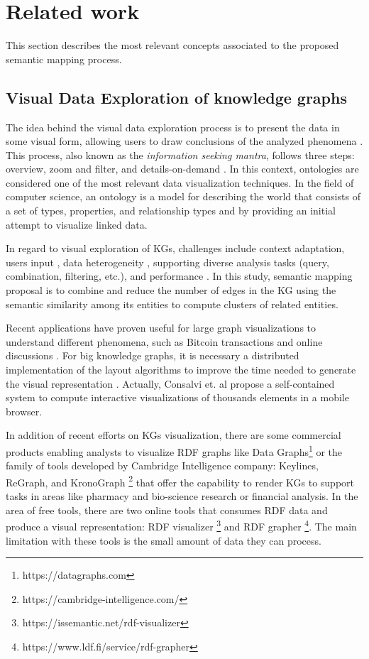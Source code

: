 \documentclass{ieeeaccess}
\begin{document}
\section{Related work}
\label{sec:related}

This section describes the most relevant concepts associated to
the proposed semantic mapping process.

\subsection{Visual Data Exploration of knowledge graphs}
The idea behind the visual data exploration process is to present 
the data in some visual form, allowing users to draw conclusions 
of the analyzed phenomena \cite{keim2001visual}. This process, also
known as the \textit{information seeking mantra}, follows three steps: overview,
zoom and filter, and details-on-demand \cite{Shneiderman96}. In this
context, ontologies are considered one of the most relevant data
visualization techniques. In the field of computer science, an ontology
is a model for describing the world that consists of a set of types,
properties, and relationship types \cite{Garshol2004MetadataTT}
and by providing an initial attempt to visualize linked data.

In regard to visual exploration of KGs, challenges include context
adaptation, users input \cite{Koutra2019}, data heterogeneity
\cite{OntoVis,6787141,1703364}, supporting diverse analysis tasks 
(query, combination, filtering, etc.), and performance
\cite{gomez2018visualizing}. In this study, semantic mapping proposal
is to combine and reduce the number of edges in the KG using the 
semantic similarity among its entities to compute clusters of related
entities.


Recent applications have proven useful for large graph visualizations 
to understand different phenomena, such as Bitcoin transactions 
\cite{mcginn2016visualizing} and online discussions
\cite{molina2017improving}. For big knowledge graphs, it is necessary a
distributed implementation of the layout algorithms to improve the time 
needed to generate the visual representation
\cite{gomez2018visualizing}. Actually, Consalvi et. al \cite{Consalvi2022} 
propose a self-contained system to compute interactive visualizations of
thousands elements in a mobile browser.

In addition of recent efforts on KGs visualization, there are some commercial
products enabling analysts to visualize RDF graphs like Data
Graphs\footnote{https://datagraphs.com} or the 
family of tools developed by Cambridge Intelligence company: Keylines, 
ReGraph, and KronoGraph \footnote{https://cambridge-intelligence.com/}
that offer the capability to render KGs to support tasks in areas like 
pharmacy and bio-science research or financial analysis. In the area of 
free tools, there are two online tools that consumes RDF data and produce 
a visual representation: RDF visualizer
\footnote{https://issemantic.net/rdf-visualizer}
and RDF grapher \footnote{https://www.ldf.fi/service/rdf-grapher}. The
main limitation with these tools is the small amount of data they
can process.
\end{document}
